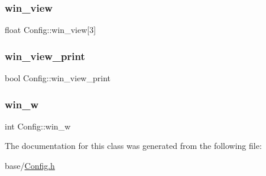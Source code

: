 \mbox{\label{classConfig_a002d3676f26f2ec2b32e7f396d747d36}} 
\subsubsection{\texorpdfstring{win\+\_\+view}{win\_view}}
{\footnotesize\ttfamily float Config\+::win\+\_\+view\mbox{[}3\mbox{]}}

\mbox{\label{classConfig_a875c1f62b9fcb9a3ca1ab3cc0e736d99}} 
\subsubsection{\texorpdfstring{win\+\_\+view\+\_\+print}{win\_view\_print}}
{\footnotesize\ttfamily bool Config\+::win\+\_\+view\+\_\+print}

\mbox{\label{classConfig_a82c36877b6bfae4bc2fc7f1333798b96}} 
\subsubsection{\texorpdfstring{win\+\_\+w}{win\_w}}
{\footnotesize\ttfamily int Config\+::win\+\_\+w}



The documentation for this class was generated from the following file\+:\begin{DoxyCompactItemize}
\item 
base/\mbox{\hyperlink{Config_8h}{Config.\+h}}\end{DoxyCompactItemize}
